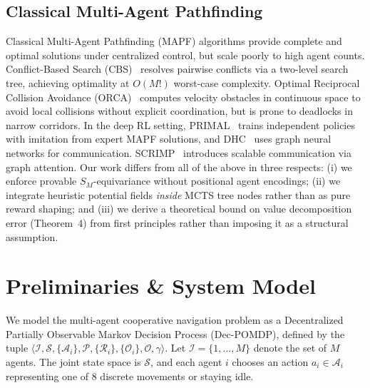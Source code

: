 \documentclass[11pt,a4paper]{article}
\begin{document}
\subsection{Classical Multi-Agent Pathfinding}
Classical Multi-Agent Pathfinding (MAPF) algorithms provide complete and optimal solutions under centralized control, but scale poorly to high agent counts. Conflict-Based Search (CBS)~\cite{sharon2015conflict} resolves pairwise conflicts via a two-level search tree, achieving optimality at $O(M!)$ worst-case complexity. Optimal Reciprocal Collision Avoidance (ORCA)~\cite{vandenberg2011reciprocal} computes velocity obstacles in continuous space to avoid local collisions without explicit coordination, but is prone to deadlocks in narrow corridors. In the deep RL setting, PRIMAL~\cite{sartoretti2019primal} trains independent policies with imitation from expert MAPF solutions, and DHC~\cite{ma2021distributed} uses graph neural networks for communication. SCRIMP~\cite{wang2023scrimp} introduces scalable communication via graph attention. Our work differs from all of the above in three respects: (i) we enforce provable $S_M$-equivariance without positional agent encodings; (ii) we integrate heuristic potential fields \emph{inside} MCTS tree nodes rather than as pure reward shaping; and (iii) we derive a theoretical bound on value decomposition error (Theorem~4) from first principles rather than imposing it as a structural assumption.



\section{Preliminaries \& System Model}
We model the multi-agent cooperative navigation problem as a Decentralized Partially Observable Markov Decision Process (Dec-POMDP), defined by the tuple $\langle \mathcal{I}, \mathcal{S}, \{\mathcal{A}_i\}, \mathcal{P}, \{\mathcal{R}_i\}, \{\mathcal{O}_i\}, \mathcal{O}, \gamma \rangle$. Let $\mathcal{I} = \{1, \dots, M\}$ denote the set of $M$ agents. The joint state space is $\mathcal{S}$, and each agent $i$ chooses an action $a_i \in \mathcal{A}_i$ representing one of 8 discrete movements or staying idle.
\end{document}
